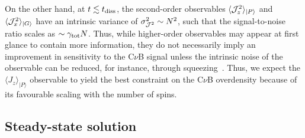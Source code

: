 \documentclass[aps,prd,10pt,twocolumn,superscriptaddress,floatfix,nofootinbib,amsmath,amssymb,altaffilletter,preprintnumbers]{revtex4-1}
\begin{document}
On the other hand, at $t\lesssim t_{\rm diss}$, the second-order observables $\langle {\cal J}_z^2 \rangle_{\vert P\rangle}$ and $\langle {\cal J}_x^2 \rangle_{\vert G\rangle}$  have an intrinsic variance of $\sigma^2_{{\cal J}^2}\sim N^2$, such that the signal-to-noise ratio scales as $\sim \gamma_{\rm tot}N$. Thus,  while higher-order observables may appear at first glance to contain more information, they do not necessarily imply an improvement in sensitivity to the C$\nu$B signal unless the intrinsic noise of the observable can be reduced, for instance, through squeezing~\cite{Arvanitaki:2024taq}. Thus, we expect the $\langle J_z\rangle_{\vert P\rangle}$ observable to yield the best constraint on the C$\nu$B overdensity because of its favourable scaling with the number of spins. 




\subsection{Steady-state solution}
\end{document}
